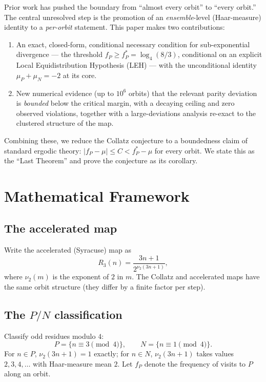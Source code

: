 \documentclass[12pt,reqno]{amsart}
\theoremstyle{plain}
\theoremstyle{definition}
\newcommand{\nuTwo}{\nu_2}
\newcommand{\logfour}{\log_4}
\newcommand{\fP}{f_P}
\newcommand{\fPstar}{f_P^*}
\newcommand{\muP}{\mu_P}
\newcommand{\muN}{\mu_N}
\begin{document}
Prior work \cite{tao2019, chang2026reduction, chang2026paradigm} has pushed the
boundary from ``almost every orbit'' to ``every orbit.'' The central unresolved
step is the promotion of an \emph{ensemble}-level (Haar-measure) identity to a
\emph{per-orbit} statement. This paper makes two contributions:

\begin{enumerate}
\item An exact, closed-form, conditional necessary condition for sub-exponential
      divergence --- the threshold $\fP \geq \fPstar = \logfour(8/3)$, conditional
      on an explicit Local Equidistribution Hypothesis (LEH) --- with the
      unconditional identity $\muP + \muN = -2$ at its core.
\item New numerical evidence (up to $10^6$ orbits) that the relevant parity
      deviation is \emph{bounded} below the critical margin, with a decaying
      ceiling and zero observed violations, together with a large-deviations
      analysis re-exact to the clustered structure of the map.
\end{enumerate}

Combining these, we reduce the Collatz conjecture to a boundedness claim of
standard ergodic theory: $|\fP - \mu| \le C < \fPstar - \mu$ for every orbit.
We state this as the ``Last Theorem'' and prove the conjecture as its corollary.

\section{Mathematical Framework}\label{sec:framework}

\subsection{The accelerated map}

Write the accelerated (Syracuse) map as
\[
R_3(n) = \frac{3n+1}{2^{\nuTwo(3n+1)}},
\]
where $\nuTwo(m)$ is the exponent of $2$ in $m$. The Collatz and accelerated
maps have the same orbit structure (they differ by a finite factor per step).

\subsection{The $P/N$ classification}\label{sec:PN}

Classify odd residues modulo $4$:
\[
P = \{n \equiv 3 \pmod 4\},\qquad N = \{n \equiv 1 \pmod 4\}.
\]
For $n \in P$, $\nuTwo(3n+1) = 1$ exactly; for $n \in N$, $\nuTwo(3n+1)$
takes values $2,3,4,\ldots$ with Haar-measure mean $2$. Let $\fP$ denote the
frequency of visits to $P$ along an orbit.
\end{document}
